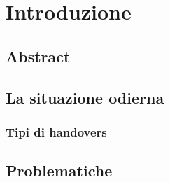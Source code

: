 \chapter{Introduzione}

\section{Abstract}

\section{La situazione odierna}

\subsection{Tipi di handovers}

\section{Problematiche}